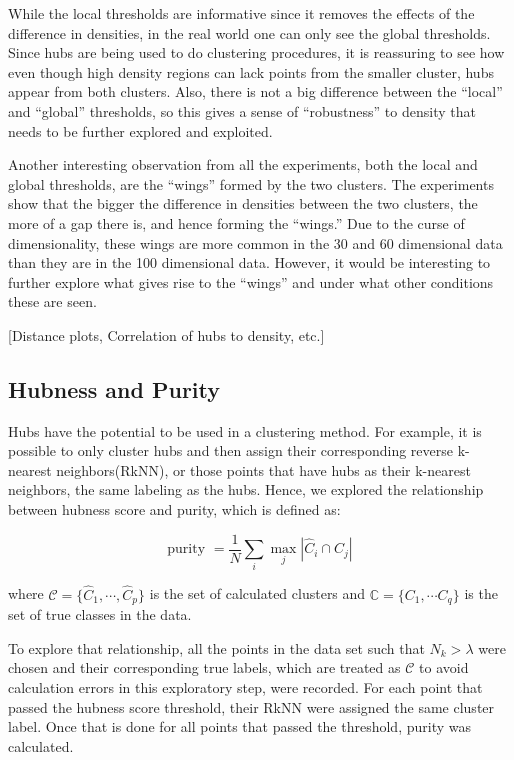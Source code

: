 \documentclass[graybox]{svmult}
\begin{document}
While the local thresholds are informative since it removes the effects of the difference in densities, in the real world one can only see the global thresholds. Since hubs are being used to do clustering procedures, it is reassuring to see how even though high density regions can lack points from the smaller cluster, hubs appear from both clusters. Also, there is not a big difference between the ``local'' and ``global'' thresholds, so this gives a sense of ``robustness'' to density that needs to be further explored and exploited.

Another interesting observation from all the experiments, both the local and global thresholds, are the ``wings'' formed by the two clusters. The experiments show that the bigger the difference in densities between the two clusters, the more of a gap there is, and hence forming the ``wings.'' Due to the curse of dimensionality, these wings are more common in the 30 and 60 dimensional data than they are in the 100 dimensional data. However, it would be interesting to further explore what gives rise to the ``wings'' and under what other conditions these are seen.

[Distance plots, Correlation of hubs to density, etc.]

\subsection{Hubness and Purity}
\label{purityHubness}

Hubs have the potential to be used in a clustering method. For example, it is possible to only cluster hubs and then assign their corresponding reverse k-nearest neighbors(RkNN), or those points that have hubs as their k-nearest neighbors, the same labeling as the hubs. Hence, we explored the relationship between hubness score and purity, which is defined as:

\[
\mbox{purity } = \frac{1}{N} \sum_i \max_j |\hat{C}_i \cap C_j|
\]

where $\mathcal{C} = \{\hat{C}_1,\cdots,\hat{C}_p\}$ is the set of calculated clusters and $\mathbb{C} = \{C_1,\cdots C_q\}$ is the set of true classes in the data.

To explore that relationship, all the points in the data set such that $N_k > \lambda$ were chosen and their corresponding true labels, which are treated as $\mathcal{C}$ to avoid calculation errors in this exploratory step, were recorded. For each point that passed the hubness score threshold, their RkNN were assigned the same cluster label. Once that is done for all points that passed the threshold, purity was calculated.
\end{document}

